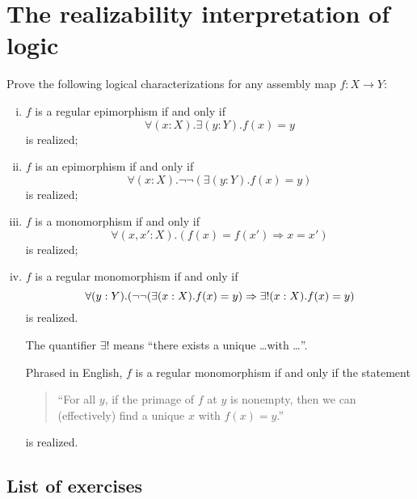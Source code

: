 \chapter{The realizability interpretation of logic}\label{chap:logic}

\begin{exercise}
  Prove the following logical characterizations for any assembly map \(f \colon X \to Y\):
  \begin{enumerate}[(i)]
  \item \(f\) is a regular epimorphism if and only if
    \[
      \forall(x : X).\exists(y : Y).f(x) = y
    \]
    is realized;
  \item \(f\) is an epimorphism if and only if
    \[
      \forall(x : X).\lnot\lnot({\exists(y : Y).f(x) = y})
    \]
    is realized;
  \item \(f\) is a monomorphism if and only if
    \[
      \forall(x, x' : X).(f(x) = f(x') \Rightarrow x = x')
    \]
    is realized;
  \item \(f\) is a regular monomorphism if and only if
    \[
      \forall(y : Y).\pa*{\lnot\lnot\pa*{\exists(x : X).f(x) = y} \Rightarrow \exists!(x : X).f(x) = y}
    \]
    is realized.

    The quantifier \(\exists!\) means ``there exists a unique \dots with \dots''.

    Phrased in English, \(f\) is a regular monomorphism if and only if the statement
    \begin{quote}{``For all \(y\), if the primage of \(f\) at \(y\) is nonempty, then we can
      (effectively) find a unique \(x\) with \(f(x) = y\).''}\end{quote}
    is realized.
  \end{enumerate}
\end{exercise}

\section{List of exercises}

